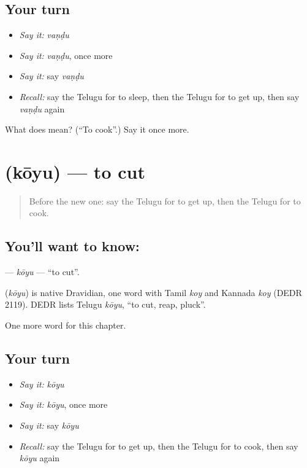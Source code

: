 \subsection*{Your turn}
\begin{itemize}
\raggedright
  \item \emph{Say it:} \emph{vaṇḍu}
  \item \emph{Say it:} \emph{vaṇḍu}, once more
  \item \emph{Say it:} say \emph{vaṇḍu}
  \item \emph{Recall:} say the Telugu for to sleep, then the Telugu for to get up, then say \emph{vaṇḍu} again
\end{itemize}

\begin{tcolorbox}[breakable,colback=teal!4,colframe=teal!35!black,title={Before you move on}]
What does  mean? (\textquotedblleft{}To cook\textquotedblright{}.) Say it once more.
\end{tcolorbox}
\section[\texorpdfstring{\te{కోయు} (kōyu)}{కోయు (kōyu)}]{ (kōyu) — to cut}

\label{lesson:TE-C144-koyu}



\begin{quote}
Before the new one: say the Telugu for to get up, then the Telugu for to cook.
\end{quote}

\subsection*{You'll want to know: }
\textbf{} — \emph{kōyu} — \textquotedblleft{}to cut\textquotedblright{}.

\begin{cousinweb}
\textbf{} (\emph{kōyu}) is native Dravidian, one word with Tamil \emph{koy} and Kannada \emph{koy} (DEDR 2119). DEDR lists Telugu \emph{kōyu}, \textquotedblleft{}to cut, reap, pluck\textquotedblright{}.
\end{cousinweb}

\begin{grammarlens}[title={What you've built}]
One more word for this chapter.
\end{grammarlens}

\subsection*{Your turn}
\begin{itemize}
\raggedright
  \item \emph{Say it:} \emph{kōyu}
  \item \emph{Say it:} \emph{kōyu}, once more
  \item \emph{Say it:} say \emph{kōyu}
  \item \emph{Recall:} say the Telugu for to get up, then the Telugu for to cook, then say \emph{kōyu} again
\end{itemize}

